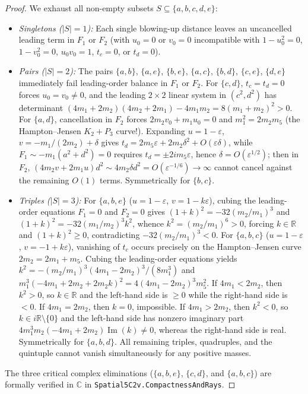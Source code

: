 \documentclass[11pt,a4paper]{amsart}
\theoremstyle{definition}
\theoremstyle{remark}
\newcommand{\R}{\mathbb{R}}
\newcommand{\C}{\mathbb{C}}
\begin{document}
\begin{proof}
We exhaust all non-empty subsets $S \subseteq \{a,b,c,d,e\}$:
\begin{itemize}
  \item \emph{Singletons ($|S|=1$):} Each single blowing-up distance leaves an uncancelled
        leading term in $F_1$ or $F_2$ (with $u_0 = 0$ or $v_0 = 0$ incompatible with
        $1 - u_0^2 = 0$, $1 - v_0^2 = 0$, $u_0 v_0 = 1$, $t_c = 0$, or $t_d = 0$).
  \item \emph{Pairs ($|S|=2$):} The pairs $\{a,b\}$, $\{a,e\}$, $\{b,e\}$, $\{a,c\}$,
        $\{b,d\}$, $\{c,e\}$, $\{d,e\}$ immediately fail leading-order balance in $F_1$
        or $F_2$.
        For $\{c,d\}$, $t_c = t_d = 0$ forces $u_0 = v_0 \neq 0$, and the leading $2\times 2$
        linear system in $(c^2, d^2)$ has determinant
        $(4m_1+2m_2)(4m_2+2m_1) - 4 m_1 m_2 = 8(m_1 + m_2)^2 > 0$.
        For $\{a,d\}$, cancellation in $F_2$ forces $2 m_2 v_0 + m_1 u_0 = 0$ and
        $m_1^2 = 2 m_2 m_5$ (the Hampton--Jensen $K_2 + P_3$ curve!).
        Expanding $u = 1 - \varepsilon$, $v = -m_1/(2m_2) + \delta$ gives
        $t_d = 2 m_5 \varepsilon + 2 m_2 \delta^2 + O(\varepsilon \delta)$, while
        $F_1 \sim -m_1(a^2 + d^2) = 0$ requires $t_d = \pm 2 i m_5 \varepsilon$, hence
        $\delta = O(\varepsilon^{1/2})$; then in $F_2$,
        $(4 m_2 v + 2 m_1 u) d^2 \sim 4 m_2 \delta d^2 = O(\varepsilon^{-1/6}) \to \infty$
        cannot cancel against the remaining $O(1)$ terms. Symmetrically for $\{b,c\}$.
  \item \emph{Triples ($|S|=3$):}
        For $\{a,b,e\}$ ($u = 1 - \varepsilon$, $v = 1 - k\varepsilon$), cubing the
        leading-order equations $F_1 = 0$ and $F_2 = 0$ gives
        $(1+k)^2 = -32(m_2/m_1)^3$ and $(1+k)^2 = -32(m_1/m_2)^3 k^2$, whence
        $k^2 = (m_2/m_1)^6 > 0$, forcing $k \in \R$ and $(1+k)^2 \ge 0$, contradicting
        $-32(m_2/m_1)^3 < 0$.
        For $\{a,b,c\}$ ($u = 1 - \varepsilon$, $v = -1 + k\varepsilon$), vanishing of
        $t_c$ occurs precisely on the Hampton--Jensen curve $2 m_2 = 2 m_1 + m_5$.
        Cubing the leading-order equations yields
        $k^2 = -(m_2/m_1)^3 (4 m_1 - 2 m_2)^3 / (8 m_1^3)$ and
        $m_1^3 (-4 m_1 + 2 m_2 + 2 m_2 k)^2 = 4(4 m_1 - 2 m_2)^3 m_5^2$.
        If $4 m_1 < 2 m_2$, then $k^2 > 0$, so $k \in \R$ and the left-hand side is
        $\ge 0$ while the right-hand side is $< 0$.
        If $4 m_1 = 2 m_2$, then $k = 0$, impossible.
        If $4 m_1 > 2 m_2$, then $k^2 < 0$, so $k \in i \R \setminus \{0\}$ and the
        left-hand side has nonzero imaginary part
        $4 m_1^3 m_2 (-4 m_1 + 2 m_2) \operatorname{Im}(k) \neq 0$, whereas the
        right-hand side is real.
        Symmetrically for $\{a,b,d\}$. All remaining triples, quadruples, and the
        quintuple cannot vanish simultaneously for any positive masses.
\end{itemize}
The three critical complex eliminations ($\{a,b,e\}$, $\{c,d\}$, and $\{a,b,c\}$) are
formally verified in $\C$ in \texttt{Spatial5C2v.CompactnessAndRays}.
\end{proof}
\end{document}

